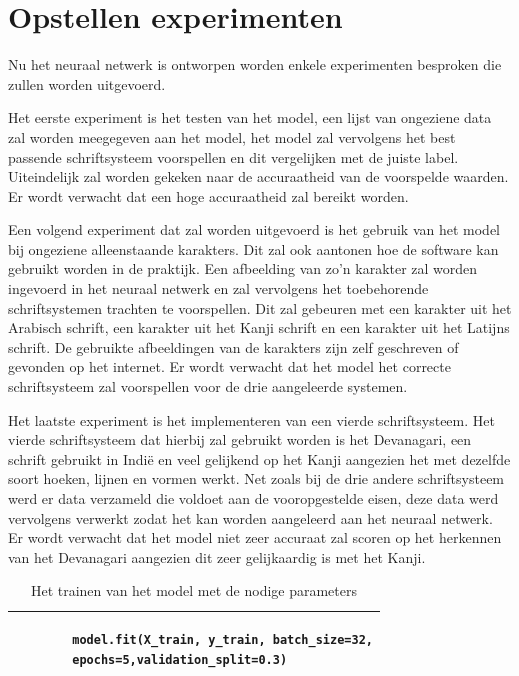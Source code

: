 \section{Opstellen experimenten}

Nu het neuraal netwerk is ontworpen worden enkele experimenten besproken die zullen worden uitgevoerd.

Het eerste experiment is het testen van het model, een lijst van ongeziene data zal worden meegegeven aan het model, het model zal vervolgens het best passende schriftsysteem voorspellen en dit vergelijken met de juiste label.
Uiteindelijk zal worden gekeken naar de accuraatheid van de voorspelde waarden.
Er wordt verwacht dat een hoge accuraatheid zal bereikt worden.

Een volgend experiment dat zal worden uitgevoerd is het gebruik van het model bij ongeziene alleenstaande karakters. Dit zal ook aantonen hoe de software kan gebruikt worden in de praktijk.
Een afbeelding van zo'n karakter zal worden ingevoerd in het neuraal netwerk en zal vervolgens het toebehorende schriftsystemen trachten te voorspellen.
Dit zal gebeuren met een karakter uit het Arabisch schrift, een karakter uit het Kanji schrift en een karakter uit het Latijns schrift.
De gebruikte afbeeldingen van de karakters zijn zelf geschreven of gevonden op het internet.
Er wordt verwacht dat het model het correcte schriftsysteem zal voorspellen voor de drie aangeleerde systemen.

Het laatste experiment is het implementeren van een vierde schriftsysteem.
Het vierde schriftsysteem dat hierbij zal gebruikt worden is het Devanagari, een schrift gebruikt in Indië en veel gelijkend op het Kanji aangezien het met dezelfde soort hoeken, lijnen en vormen werkt.
Net zoals bij de drie andere schriftsysteem werd er data verzameld die voldoet aan de vooropgestelde eisen, deze data werd vervolgens verwerkt zodat het kan worden aangeleerd aan het neuraal netwerk.
Er wordt verwacht dat het model niet zeer accuraat zal scoren op het herkennen van het Devanagari aangezien dit zeer gelijkaardig is met het Kanji.



\begin{table}[!htbp]
    \begin{tabular}{|l|}
        \hline
        \begin{lstlisting}
        model.fit(X_train, y_train, batch_size=32,
        epochs=5,validation_split=0.3)
        \end{lstlisting}
        \\ \hline
    \end{tabular}
    \caption{Het trainen van het model met de nodige parameters} \label{table:Training}
\end{table}

